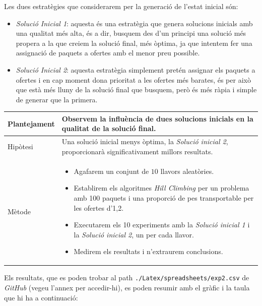 \documentclass[a4paper]{article}
\begin{document}
	Les dues estratègies que considerarem per la generació de l'estat inicial són:
	
	\begin{itemize}
		\item \emph{Solució Inicial 1}: aquesta és una estratègia que genera solucions inicials amb una qualitat més alta, és a dir, busquem des d'un principi una solució més propera a la que creiem la solució final, més òptima, ja que intentem fer una assignació de paquets a ofertes amb el menor preu possible.
		
		\item \emph{Solució Inicial 2}: aquesta estratègia simplement pretén assignar els paquets a ofertes i en cap moment dona prioritat a les ofertes més barates, és per això que està més lluny de la solució final que busquem, però és més ràpia i simple de generar que la primera.
	\end{itemize}
	
	
	\begin{table}[ht]
		\centering
		\begin{tabular}{|l|p{10cm}|}
			\hline
			Plantejament & Observem la influència de dues solucions inicials en la qualitat de la solució final. \\
			\hline
			Hipòtesi & Una solució inicial menys òptima, la \textit{Solució inicial 2}, proporcionarà significativament millors resultats.\\
			\hline
			Mètode & 
			\begin{itemize}
				\item Agafarem un conjunt de $10$ llavors aleatòries.
				\item Establirem els algoritmes \textit{Hill Climbing} per un problema amb 100 paquets i una proporció de pes transportable per les ofertes d'1,2.
				\item Executarem els 10 experiments amb la \textit{Solució inicial 1} i la \textit{Solució inicial 2}, un per cada llavor.
				\item Medirem els resultats i n'extraurem conclusions.
			\end{itemize} \\
			\hline
		\end{tabular}
		\label{tab:exp2_apartats}
	\end{table}
	
	Els resultats, que es poden trobar al path \texttt{./Latex/spreadsheets/exp2.csv} de \textit{GitHub} (vegeu l'annex per accedir-hi), es poden resumir amb el gràfic i la taula que hi ha a continuació:
	
\end{document}
